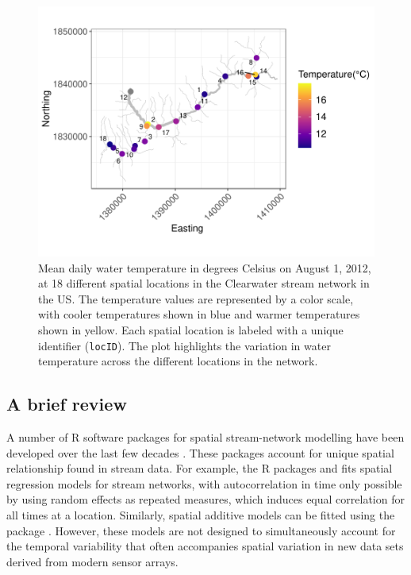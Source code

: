  

\begin{figure}[htb]
  \centering
   \includegraphics[width=4.5in]{./Figs_Pay/net.pdf}
  \caption{%
 Mean daily water temperature in degrees Celsius on August 1, 2012, at 18 different spatial locations in the Clearwater stream network in the US. The temperature values are represented by a color scale, with cooler temperatures shown in blue and warmer temperatures shown in yellow. Each spatial location is labeled with a unique identifier (\texttt{locID}). The plot highlights the variation in water temperature across the different locations in the network.
 } 
  \label{figure:net}
\end{figure}


\subsection{A brief review}
\label{sec:review}

A number of \textsf{R} software packages for spatial stream-network modelling have been developed over the last few decades \citep{hoef2014ssn, rtop, smnet}.
These packages account for unique spatial relationship found in stream data.
For example, the \textsf{R} packages  and  \citep{hoef2014ssn, SSN2} fits spatial regression models for stream networks, with autocorrelation in time only possible by using random effects as repeated measures, which induces equal correlation for all times at a location. Similarly, spatial additive models can be fitted using the package  \citep{smnet}.
However, these models are not designed to simultaneously account for the temporal variability that often accompanies spatial variation in new data sets derived from modern sensor arrays. 


